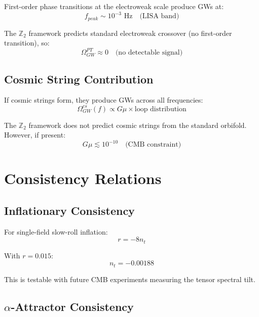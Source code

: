 \documentclass[12pt,a4paper]{article}
\begin{document}
First-order phase transitions at the electroweak scale produce GWs at:
\begin{equation}
f_{peak} \sim 10^{-3} \text{ Hz} \quad \text{(LISA band)}
\end{equation}

The $\mathbb{Z}_2$ framework predicts standard electroweak crossover (no first-order transition), so:
\begin{equation}
\Omega_{GW}^{PT} \approx 0 \quad \text{(no detectable signal)}
\end{equation}

\subsection{Cosmic String Contribution}

If cosmic strings form, they produce GWs across all frequencies:
\begin{equation}
\Omega_{GW}^{cs}(f) \propto G\mu \times \text{loop distribution}
\end{equation}

The $\mathbb{Z}_2$ framework does not predict cosmic strings from the standard orbifold. However, if present:
\begin{equation}
G\mu \lesssim 10^{-10} \quad \text{(CMB constraint)}
\end{equation}

\section{Consistency Relations}

\subsection{Inflationary Consistency}

For single-field slow-roll inflation:
\begin{equation}
r = -8 n_t
\end{equation}

With $r = 0.015$:
\begin{equation}
n_t = -0.00188
\end{equation}

This is testable with future CMB experiments measuring the tensor spectral tilt.

\subsection{$\alpha$-Attractor Consistency}
\end{document}

